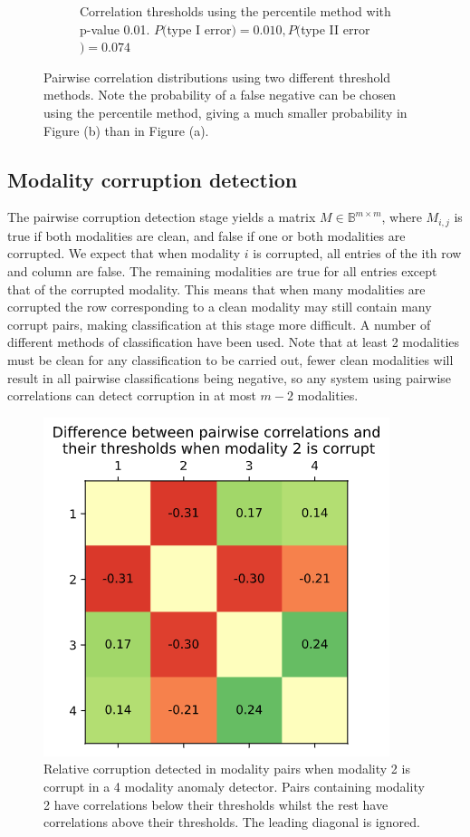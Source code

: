 \begin{figure}[ht]
\begin{subfigure}{.5\textwidth}
      \caption{Correlation thresholds using the percentile method with p-value 0.01. $P($type I error$)=0.010, P($type II error$)=0.074$}
      \label{fig:ppf_dist}
    \end{subfigure}
    \caption{Pairwise correlation distributions using two different threshold methods. Note the probability of a false negative can be chosen using the percentile method, giving a much smaller probability in Figure (b) than in Figure (a).}
    \label{fig:correlation_dist}
\end{figure}


\subsection{Modality corruption detection}
The pairwise corruption detection stage yields a matrix $M\in\mathbb{B}^{m\times m}$, where $M_{i,j}$ is true if both modalities are clean, and false if one or both modalities are corrupted. We expect that when modality $i$ is corrupted, all entries of the ith row and column are false. The remaining modalities are true for all entries except that of the corrupted modality. This means that when many modalities are corrupted the row corresponding to a clean modality may still contain many corrupt pairs, making classification at this stage more difficult. A number of different methods of classification have been used. Note that at least 2 modalities must be clean for any classification to be carried out, fewer clean modalities will result in all pairwise classifications being negative, so any system using pairwise correlations can detect corruption in at most $m-2$ modalities.

\begin{figure}[H]
    \centering\captionsetup{width=.8\linewidth}
    \includegraphics[width=.5\textwidth]{images/all_corrs.png}
    \caption{Relative corruption detected in modality pairs when modality 2 is corrupt in a 4 modality anomaly detector. Pairs containing modality 2 have correlations below their thresholds whilst the rest have correlations above their thresholds. The leading diagonal is ignored.}
    \label{fig:all_corrs}
\end{figure}

